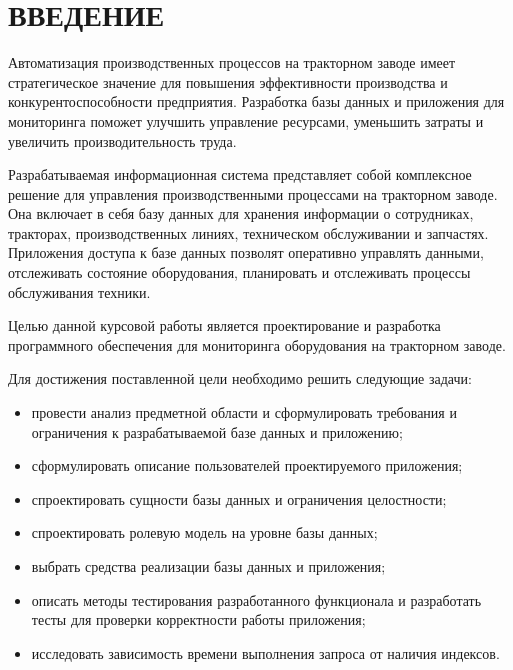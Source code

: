 \chapter*{ВВЕДЕНИЕ}

Автоматизация производственных процессов на тракторном заводе имеет стратегическое значение для повышения эффективности производства и конкурентоспособности предприятия. Разработка базы данных и приложения для мониторинга поможет улучшить управление ресурсами, уменьшить затраты и увеличить производительность труда.

Разрабатываемая информационная система представляет собой комплексное решение для управления производственными процессами на тракторном заводе. Она включает в себя базу данных для хранения информации о сотрудниках, тракторах, производственных линиях, техническом обслуживании и запчастях. Приложения доступа к базе данных позволят оперативно управлять данными, отслеживать состояние оборудования, планировать и отслеживать процессы обслуживания техники.

Целью данной курсовой работы является проектирование и разработка программного обеспечения для мониторинга оборудования на тракторном заводе.

Для достижения поставленной цели необходимо решить следующие задачи:

\begin{itemize}[label=---]
    \item провести анализ предметной области и сформулировать требования и ограничения к 
разрабатываемой базе данных и приложению; 
    \item сформулировать описание пользователей проектируемого приложения;
    \item спроектировать сущности базы данных и ограничения целостности;
    \item спроектировать ролевую модель на уровне базы данных;
    \item выбрать средства реализации базы данных и приложения;
    \item описать методы тестирования разработанного функционала и разработать тесты для проверки корректности работы приложения;
    \item исследовать зависимость времени выполнения запроса от наличия индексов.
\end{itemize}